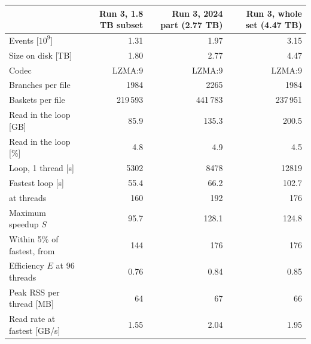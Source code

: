 \begin{tabular}{lrrr}
\toprule
 & Run 3, 1.8 TB subset & Run 3, 2024 part (2.77 TB) & Run 3, whole set (4.47 TB) \\
\midrule
Events [$10^9$] & 1.31 & 1.97 & 3.15 \\
Size on disk [TB] & 1.80 & 2.77 & 4.47 \\
Codec & LZMA:9 & LZMA:9 & LZMA:9 \\
Branches per file & 1984 & 2265 & 1984 \\
Baskets per file & 219\,593 & 441\,783 & 237\,951 \\
Read in the loop [GB] & 85.9 & 135.3 & 200.5 \\
Read in the loop [\%] & 4.8 & 4.9 & 4.5 \\
Loop, 1 thread [s] & 5302 & 8478 & 12819 \\
Fastest loop [s] & 55.4 & 66.2 & 102.7 \\
at threads & 160 & 192 & 176 \\
Maximum speedup $S$ & 95.7 & 128.1 & 124.8 \\
Within 5\% of fastest, from & 144 & 176 & 176 \\
Efficiency $E$ at 96 threads & 0.76 & 0.84 & 0.85 \\
Peak RSS per thread [MB] & 64 & 67 & 66 \\
Read rate at fastest [GB/s] & 1.55 & 2.04 & 1.95 \\
\bottomrule
\end{tabular}
